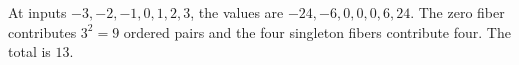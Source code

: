 At inputs $-3,-2,-1,0,1,2,3$, the values are $-24,-6,0,0,0,6,24$. The zero fiber contributes $3^2=9$ ordered pairs and the four singleton fibers contribute four. The total is $\boxed{13}$.
